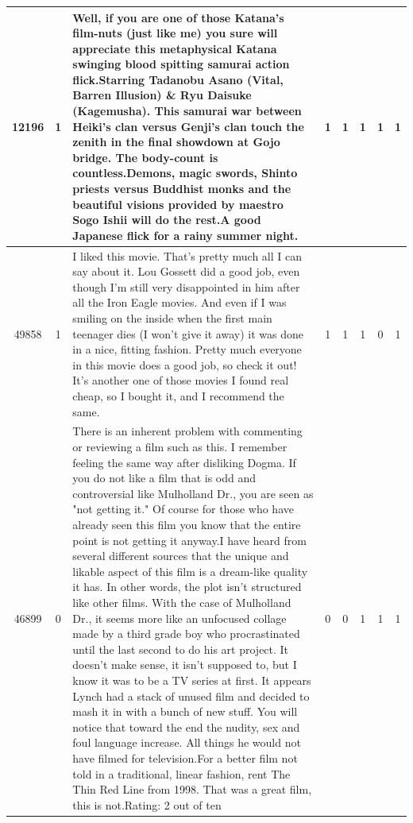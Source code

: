 \begin{table}
\begin{tabular}{ |c|c|p{15cm}| c c c c c |}
		12196 &		1 & {\scriptsize  Well, if you are one of those Katana's film-nuts (just like me) you sure will appreciate this metaphysical Katana swinging blood spitting samurai action flick.Starring Tadanobu Asano (Vital, Barren Illusion) \& Ryu Daisuke (Kagemusha). This samurai war between Heiki's clan versus Genji's clan touch the zenith in the final showdown at Gojo bridge. The body-count is countless.Demons, magic swords, Shinto priests versus Buddhist monks and the beautiful visions provided by maestro Sogo Ishii will do the rest.A good Japanese flick for a rainy summer night.} & 1 & 1 &1 &1&1 \\
		\hline
		49858&	1 & {\scriptsize  I liked this movie. That's pretty much all I can say about it. Lou Gossett did a good job, even though I'm still very disappointed in him after all the Iron Eagle movies. And even if I was smiling on the inside when the first main teenager dies (I won't give it away) it was done in a nice, fitting fashion. Pretty much everyone in this movie does a good job, so check it out! It's another one of those movies I found real cheap, so I bought it, and I recommend the same.} & 1&1&1&0&1\\	
		\hline
		46899 &		0&{\scriptsize  There is an inherent problem with commenting or reviewing a film such as this. I remember feeling the same way after disliking Dogma. If you do not like a film that is odd and controversial like Mulholland Dr., you are seen as "not getting it." Of course for those who have already seen this film you know that the entire point is not getting it anyway.I have heard from several different sources that the unique and likable aspect of this film is a dream-like quality it has. In other words, the plot isn't structured like other films. With the case of Mulholland Dr., it seems more like an unfocused collage made by a third grade boy who procrastinated until the last second to do his art project. It doesn't make sense, it isn't supposed to, but I know it was to be a TV series at first. It appears Lynch had a stack of unused film and decided to mash it in with a bunch of new stuff. You will notice that toward the end the nudity, sex and foul language increase. All things he would not have filmed for television.For a better film not told in a traditional, linear fashion, rent The Thin Red Line from 1998. That was a great film, this is not.Rating: 2 out of ten} & 0&0&1&1&1 \\
		\hline
	\end{tabular}
\end{table}


